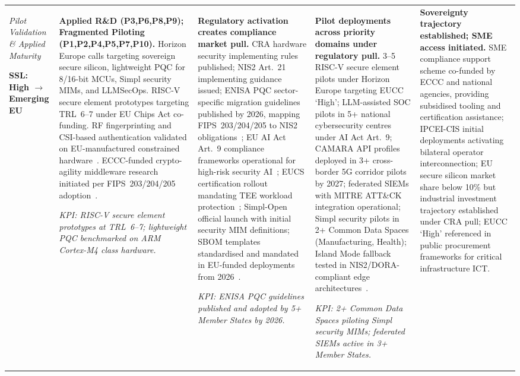 \begin{longtable}{|p{1.7cm}|p{2.2cm}|p{2.2cm}|p{2.2cm}|p{2.2cm}|}
\smallskip
\textit{Pilot Validation \& Applied Maturity}

\smallskip
\colorbox{sslamber}{\footnotesize\textbf{SSL: High $\to$ Emerging EU}}
&
\footnotesize
\textbf{Applied R\&D (P3,P6,P8,P9); Fragmented Piloting (P1,P2,P4,P5,P7,P10).}
Horizon Europe calls targeting sovereign secure silicon, lightweight PQC
for 8/16-bit MCUs, Simpl security MIMs, and LLMSecOps. RISC-V secure
element prototypes targeting TRL~6--7 under EU Chips Act co-funding.
RF fingerprinting and CSI-based authentication validated on
EU-manufactured constrained hardware~\cite{cloud_edge_roadmap}.
ECCC-funded crypto-agility middleware research initiated per
FIPS~203/204/205 adoption~\cite{eccc}.

\smallskip
\textit{KPI: RISC-V secure element prototypes at TRL~6--7; lightweight
PQC benchmarked on ARM Cortex-M4 class hardware.}
&
\footnotesize
\textbf{Regulatory activation creates compliance market pull.}
CRA hardware security implementing rules published; NIS2 Art.~21
implementing guidance issued; ENISA PQC sector-specific migration
guidelines published by 2026, mapping FIPS~203/204/205 to NIS2
obligations~\cite{nis2}; EU AI Act Art.~9 compliance frameworks
operational for high-risk security AI~\cite{aiact}; EUCS certification
rollout mandating TEE workload protection~\cite{eucs}; Simpl-Open
official launch with initial security MIM definitions; SBOM templates
standardised and mandated in EU-funded deployments from 2026~\cite{cra}.

\smallskip
\textit{KPI: ENISA PQC guidelines published and adopted by 5+
Member States by 2026.}
&
\footnotesize
\textbf{Pilot deployments across priority domains under regulatory pull.}
3--5 RISC-V secure element pilots under Horizon Europe targeting EUCC
`High'; LLM-assisted SOC pilots in 5+ national cybersecurity centres
under AI Act Art.~9; CAMARA API profiles deployed in 3+ cross-border
5G corridor pilots by 2027; federated SIEMs with MITRE ATT\&CK
integration operational; Simpl security pilots in 2+ Common Data
Spaces (Manufacturing, Health); Island Mode fallback tested in
NIS2/DORA-compliant edge architectures~\cite{concordia}.

\smallskip
\textit{KPI: 2+ Common Data Spaces piloting Simpl security MIMs;
federated SIEMs active in 3+ Member States.}
&
\footnotesize
\textbf{Sovereignty trajectory established; SME access initiated.}
SME compliance support scheme co-funded by ECCC and national agencies,
providing subsidised tooling and certification assistance; IPCEI-CIS
initial deployments activating bilateral operator interconnection; EU
secure silicon market share below 10\% but industrial investment
trajectory established under CRA pull; EUCC `High' referenced in
public procurement frameworks for critical infrastructure ICT.


\end{longtable}
